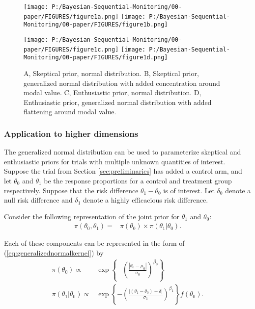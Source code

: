 \documentclass[12pt]{article}
\begin{document}
%

\begin{figure}
\texttt{[image: P:/Bayesian-Sequential-Monitoring/00-paper/FIGURES/figure1a.png]}
\texttt{[image: P:/Bayesian-Sequential-Monitoring/00-paper/FIGURES/figure1b.png]}

\texttt{[image: P:/Bayesian-Sequential-Monitoring/00-paper/FIGURES/figure1c.png]}
\texttt{[image: P:/Bayesian-Sequential-Monitoring/00-paper/FIGURES/figure1d.png]}

\caption{A, Skeptical prior, normal distribution. B, Skeptical prior, generalized normal distribution with added concentration around modal value. C, Enthusiastic prior, normal distribution. D, Enthusiastic prior, generalized normal distribution with added flattening around modal value.}
\label{fig:figure1}
\end{figure}

%
\subsubsection{Application to higher dimensions}
The generalized normal distribution can be used to parameterize skeptical and enthusiastic priors for trials with multiple unknown quantities of interest. Suppose the trial from Section \ref{sec:preliminaries} has added a control arm, and let $\theta_0$ and $\theta_1$ be the response proportions for a control and treatment group respectively. Suppose that the risk difference $\theta_1-\theta_0$ is of interest. Let $\delta_0$ denote a null risk difference and $\delta_1$ denote a highly efficacious risk difference.

Consider the following representation of the joint prior for $\theta_1$ and $\theta_0$:
\begin{align}
\pi(\theta_0,\theta_1)=&\pi(\theta_0)\times\pi(\theta_1|\theta_0). \label{eq:generalized_normal_joint}
\end{align}

Each of these components can be represented in the form of (\ref{eq:generalizednormalkernel}) by
\begin{align}
\pi(\theta_0)\propto&\exp\left\{-\left(\frac{|\theta_0-\mu_0|}{\sigma_0}\right)^{\beta_0}\right\} \label{eq:genNormPlacebo}\\
\pi(\theta_1|\theta_0)\propto&\exp\left\{-\left(\frac{|(\theta_1-\theta_0)-\delta|}{\sigma_1}\right)^{\beta_1}\right\}f(\theta_0). \label{eq:genNormRd}
\end{align}
\end{document}
